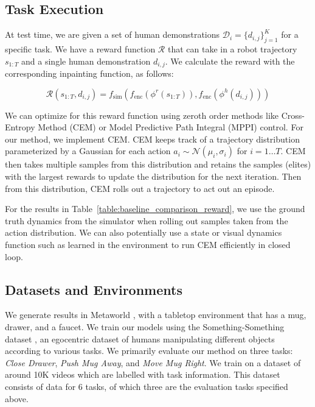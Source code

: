\subsection{Task Execution}

At test time, we are given a set of human demonstrations $\mathcal{D}_i = \{ d_{i,j} \}_{j=1}^K$ for a specific task. We have a reward function $\mathcal{R}$ that can take in a robot trajectory $s_{1:T}$ and a single human demonstration $d_{i, j}$. We calculate the reward with the corresponding inpainting function, as follows:

$$\mathcal{R}(s_{1:T}, d_{i, j}) = f_{\text{sim}}(f_{\text{enc}}(\phi^r(s_{1:T})), f_{\text{enc}}(\phi^h(d_{i, j})))$$

We can optimize for this reward function using zeroth order methods like Cross-Entropy Method (CEM) or Model Predictive Path Integral (MPPI) control. For our method, we implement CEM. CEM keeps track of a trajectory distribution parameterized by a Gaussian for each action $a_i \sim \mathcal{N}(\mu_i, \sigma_i)$ for $i = 1 \dots T$. CEM then takes multiple samples from this distribution and retains the samples (elites) with the largest rewards to update the distribution for the next iteration. Then from this distribution, CEM rolls out a trajectory to act out an episode.

For the results in Table~\ref{table:baseline_comparison_reward}, we use the ground truth dynamics from the simulator when rolling out samples taken from the action distribution. We can also potentially use a state or visual dynamics function such as \cite{hafner2019dreamer} learned in the environment to run CEM efficiently in closed loop.


\subsection{Datasets and Environments}

We generate results in Metaworld \cite{metaworld}, with a tabletop environment that has a mug, drawer, and a faucet. We train our models using the Something-Something dataset \cite{smthsmth}, an egocentric dataset of humans manipulating different objects according to various tasks. We primarily evaluate our method on three tasks: \textit{Close Drawer}, \textit{Push Mug Away}, and \textit{Move Mug Right}. We train on a dataset of around 10K videos which are labelled with task information. This dataset consists of data for 6 tasks, of which three are the evaluation tasks specified above.